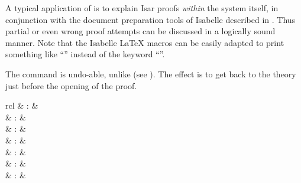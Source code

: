 \begin{isabellebody}
\begin{isamarkuptext}
  A typical application of \mbox{} is to explain Isar proofs
  \emph{within} the system itself, in conjunction with the document
  preparation tools of Isabelle described in \cite{isabelle-sys}.
  Thus partial or even wrong proof attempts can be discussed in a
  logically sound manner.  Note that the Isabelle {\LaTeX} macros can
  be easily adapted to print something like ``\isa{{\isachardoublequote}{\isasymdots}{\isachardoublequote}}'' instead of
  the keyword ``\mbox{}''.

  \medskip The \mbox{} command is undo-able, unlike
  \mbox{} (see ).  The effect is to
  get back to the theory just before the opening of the proof.%
\end{isamarkuptext}%
\isamarkuptrue%
%
\isamarkuptrue%
%
\isamarkuptrue%
%
\begin{isamarkuptext}%
\begin{matharray}{rcl}
    \mbox{}\isa{{\isachardoublequote}\isactrlsup {\isacharasterisk}{\isachardoublequote}} & : & \isarkeep{\cdot} \\
    \mbox{}\isa{{\isachardoublequote}\isactrlsup {\isacharasterisk}{\isachardoublequote}} & : &  \\
    \mbox{}\isa{{\isachardoublequote}\isactrlsup {\isacharasterisk}{\isachardoublequote}} & : &  \\
    \mbox{}\isa{{\isachardoublequote}\isactrlsup {\isacharasterisk}{\isachardoublequote}} & : &  \\
    \mbox{}\isa{{\isachardoublequote}\isactrlsup {\isacharasterisk}{\isachardoublequote}} & : &  \\
    \mbox{}\isa{{\isachardoublequote}\isactrlsup {\isacharasterisk}{\isachardoublequote}} & : &  \\
    \mbox{}\isa{{\isachardoublequote}\isactrlsup {\isacharasterisk}{\isachardoublequote}} & : &  \\
  \end{matharray}


\end{isamarkuptext}
\end{isabellebody}
